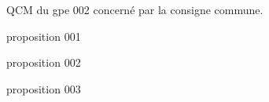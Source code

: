 \begin{exercice*}\label{N1qcmgpe002Mark002}
    QCM du gpe 002 concerné par la consigne commune.
    \begin{ChoixQCM}{3}
    \item proposition 001
    \item proposition 002
    \item proposition 003
    \end{ChoixQCM}
\end{exercice*}
\begin{corrige}
\end{corrige}